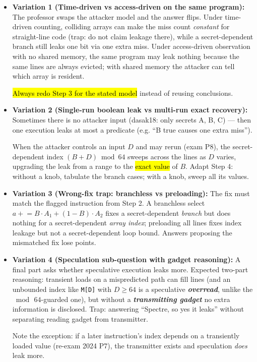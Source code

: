 \documentclass[12pt, a4paper]{article}
\newcommand{\term}[1]{\textbf{\textit{#1}}}        %
\newcommand{\imp}[1]{\hl{#1}}                       %
\begin{document}
\begin{trapbox}
\begin{itemize}
    \item \textbf{Variation 1 (Time-driven vs access-driven on the same program):} The professor swaps the attacker model and the answer flips. Under time-driven counting, colliding arrays can make the miss count \emph{constant} for straight-line code (trap: do not claim leakage there), while a secret-dependent branch still leaks one bit via one extra miss.
    Under access-driven observation with no shared memory, the same program may leak nothing because the same lines are always evicted; with shared memory the attacker can tell which array is resident.

    \imp{Always redo Step 3 for the stated model} instead of reusing conclusions.
    \item \textbf{Variation 2 (Single-run boolean leak vs multi-run exact recovery):} Sometimes there is no attacker input (dasak18: only secrets A, B, C) --- then one execution leaks at most a predicate (e.g. ``B true causes one extra miss'').

    When the attacker controls an input $D$ and may rerun (exam P8), the secret-dependent index $(B+D) \bmod 64$ sweeps across the lines as $D$ varies, upgrading the leak from a range to the \imp{exact value} of $B$. Adapt Step 4: without a knob, tabulate the branch cases; with a knob, sweep all its values.
    \item \textbf{Variation 3 (Wrong-fix trap: branchless vs preloading):} The fix must match the flagged instruction from Step 2. A branchless select $a \mathrel{+}= B \cdot A_1 + (1-B) \cdot A_2$ fixes a secret-dependent \emph{branch} but does nothing for a secret-dependent \emph{array index};
    preloading all lines fixes index leakage but not a secret-dependent loop bound. Answers proposing the mismatched fix lose points.
    \item \textbf{Variation 4 (Speculation sub-question with gadget reasoning):} A final part asks whether speculative execution leaks more. Expected two-part reasoning: transient loads on a mispredicted path can fill lines (and an unbounded index like \texttt{M[D]} with $D \geq 64$ is a speculative \term{overread}, unlike the $\bmod\, 64$-guarded one), but without a \term{transmitting gadget} no extra information is disclosed. Trap: answering ``Spectre, so yes it leaks'' without separating reading gadget from transmitter.

    Note the exception: if a later instruction's index depends on a transiently loaded value (re-exam 2024 P7), the transmitter exists and speculation \emph{does} leak more.
\end{itemize}
\end{trapbox}
\end{document}
